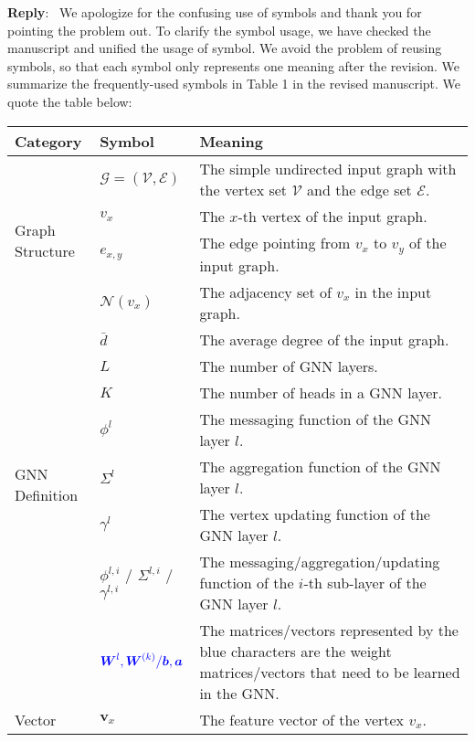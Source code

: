 \documentclass[12pt]{article}
\newcounter{reviewer}
\newcounter{point}[reviewer]
\newenvironment{reply}
   {\medskip \noindent \textbf{Reply}:\  }
   {\medskip}
\begin{document}
\begin{reply}
    We apologize for the confusing use of symbols and thank you for pointing the problem out.
    To clarify the symbol usage, we have checked the manuscript and unified the usage of symbol.
    We avoid the problem of reusing symbols, so that each symbol only represents one meaning after the revision.
    We summarize the frequently-used symbols in Table 1 in the revised manuscript.
    We quote the table below:
    \begin{table}[H]
        \footnotesize
        \centering
    \begin{tabular}{p{3em}lp{35em}}
        \toprule
        Category & Symbol & Meaning \\
        \midrule
        \multirow[c]{4}{3em}{Graph Structure}& $\mathcal{G}=(\mathcal{V}, \mathcal{E})$ & The simple undirected input graph with the vertex set $\mathcal{V}$ and the edge set $\mathcal{E}$. \\
        & $v_x$ & The $x$-th vertex of the input graph. \\
        & $e_{x,y}$ & The edge pointing from $v_x$ to $v_y$ of the input graph. \\
        & $\mathcal{N}(v_x)$ & The adjacency set of $v_x$ in the input graph. \\ 
        & $\bar{d}$ & The average degree of the input graph. \\ \midrule
        \multirow[c]{6}{3em}{GNN Definition}& $L$ & The number of GNN layers. \\
        & $K$ & The number of heads in a GNN layer. \\
        & $\phi^l$ & The messaging function of the GNN layer $l$. \\
        & $\Sigma^l$ & The aggregation function of the GNN layer $l$. \\
        & $\gamma^l$ & The vertex updating function of the GNN layer $l$. \\ 
        & $\phi^{l,i}$ / $\Sigma^{l,i}$ / $\gamma^{l,i}$ & The messaging/aggregation/updating function of the $i$-th sub-layer of the GNN layer  $l$.\\
        & $\textcolor{blue}{\boldsymbol{W}^l, \boldsymbol{W}^{(k)}/\boldsymbol{b}, \boldsymbol{a}}$ & The matrices/vectors represented by the blue characters are the weight matrices/vectors that need to be learned in the GNN. \\  \midrule
        \multirow[c]{8}{3em}{Vector}& $\boldsymbol{v}_x$ & The feature vector of the vertex $v_x$. \\

\end{tabular}
\end{table}
\end{reply}
\end{document}
